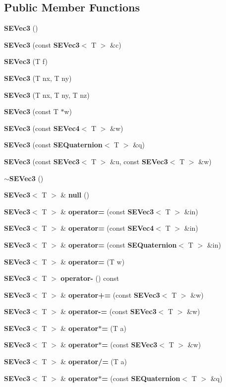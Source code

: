 \subsection*{Public Member Functions}
\begin{DoxyCompactItemize}
\item 
{\bf S\+E\+Vec3} ()
\item 
{\bf S\+E\+Vec3} (const {\bf S\+E\+Vec3}$<$ T $>$ \&c)
\item 
{\bf S\+E\+Vec3} (T f)
\item 
{\bf S\+E\+Vec3} (T nx, T ny)
\item 
{\bf S\+E\+Vec3} (T nx, T ny, T nz)
\item 
{\bf S\+E\+Vec3} (const T $\ast$w)
\item 
{\bf S\+E\+Vec3} (const {\bf S\+E\+Vec4}$<$ T $>$ \&w)
\item 
{\bf S\+E\+Vec3} (const {\bf S\+E\+Quaternion}$<$ T $>$ \&q)
\item 
{\bf S\+E\+Vec3} (const {\bf S\+E\+Vec3}$<$ T $>$ \&u, const {\bf S\+E\+Vec3}$<$ T $>$ \&w)
\item 
{\bf $\sim$\+S\+E\+Vec3} ()
\item 
{\bf S\+E\+Vec3}$<$ T $>$ \& {\bf null} ()
\item 
{\bf S\+E\+Vec3}$<$ T $>$ \& {\bf operator=} (const {\bf S\+E\+Vec3}$<$ T $>$ \&in)
\item 
{\bf S\+E\+Vec3}$<$ T $>$ \& {\bf operator=} (const {\bf S\+E\+Vec4}$<$ T $>$ \&in)
\item 
{\bf S\+E\+Vec3}$<$ T $>$ \& {\bf operator=} (const {\bf S\+E\+Quaternion}$<$ T $>$ \&in)
\item 
{\bf S\+E\+Vec3}$<$ T $>$ \& {\bf operator=} (T w)
\item 
{\bf S\+E\+Vec3}$<$ T $>$ {\bf operator-\/} () const 
\item 
{\bf S\+E\+Vec3}$<$ T $>$ \& {\bf operator+=} (const {\bf S\+E\+Vec3}$<$ T $>$ \&w)
\item 
{\bf S\+E\+Vec3}$<$ T $>$ \& {\bf operator-\/=} (const {\bf S\+E\+Vec3}$<$ T $>$ \&w)
\item 
{\bf S\+E\+Vec3}$<$ T $>$ \& {\bf operator$\ast$=} (T a)
\item 
{\bf S\+E\+Vec3}$<$ T $>$ \& {\bf operator$\ast$=} (const {\bf S\+E\+Vec3}$<$ T $>$ \&w)
\item 
{\bf S\+E\+Vec3}$<$ T $>$ \& {\bf operator/=} (T a)
\item 
{\bf S\+E\+Vec3}$<$ T $>$ \& {\bf operator$\ast$=} (const {\bf S\+E\+Quaternion}$<$ T $>$ \&q)

\end{DoxyCompactItemize}
